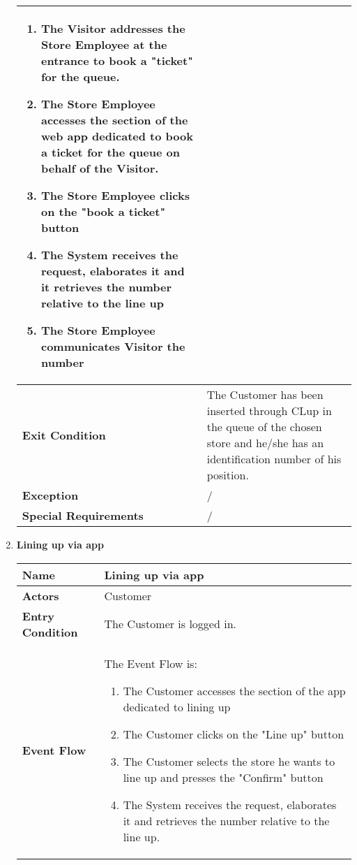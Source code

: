 \begin{enumerate}
{\begin{longtable}{|L{4cm}|L{10cm}|}
\begin{enumerate}
                        \item The Visitor addresses the Store Employee at the entrance to book a "ticket" for the queue.
                        \item The Store Employee accesses the section of the web app dedicated to book a ticket for the queue on behalf of the Visitor.
                        \item The Store Employee clicks on the "book a ticket" button
                        \item The System receives the request, elaborates it and it retrieves the number relative to the line up
                        \item The Store Employee communicates Visitor the number
                    \end{enumerate} \\
                \hline
                \textbf{Exit Condition} & The Customer has been inserted through CLup in the queue of the chosen store and he/she has an identification number of his position. \\
                \hline
                \textbf{Exception} & / \\
                \hline
                \textbf{Special Requirements} & / \\
                \hline
            \end{longtable}}
            \item \textbf{Lining up via app}{\renewcommand{\arraystretch}{2}
            \begin{longtable}{|L{4cm}|L{10cm}|}
                \hline
                \textbf{Name} &  Lining up via app \\
                \hline
                \textbf{Actors} & Customer \\
                \hline
                \textbf{Entry Condition} & The Customer is logged in. \\
                \hline
                \textbf{Event Flow} & The Event Flow is: \begin{enumerate}
                        \item The Customer accesses the section of the app dedicated to lining up
                        \item The Customer clicks on the "Line up" button
                        \item The Customer selects the store he wants to line up and presses the "Confirm" button
                        \item The System receives the request, elaborates it and retrieves the number relative to the line up.

\end{enumerate}
\end{longtable}}
\end{enumerate}
